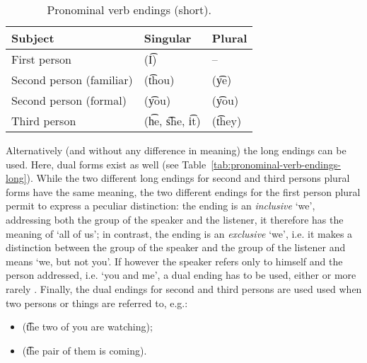 \begin{table}
\centering
\caption{Pronominal verb endings (short).}
\label{tab:pronominal-verb-endings-short}
\begin{tabular}{lll}
\toprule
Subject & Singular & Plural \\
\midrule
First person & \q{} (\t{I}) & -- \\
Second person (familiar) & \q{} (\t{thou}) & \q{} (\t{ye}) \\
Second person (formal) & \q{} (\t{you}) & \q{} (\t{you}) \\
Third person & \q{} (\t{he}, \t{she}, \t{it}) & \q{} (\t{they}) \\
\bottomrule
\end{tabular}
\end{table}

Alternatively (and without any difference in meaning) the long endings can be
used. Here, dual forms exist as well (see
Table~\ref{tab:pronominal-verb-endings-long}).
While the two different long endings for second and third persons plural forms
have the same meaning, the two different endings for the first person plural
permit to express a peculiar distinction: the ending  is an
\emph{inclusive} `we', addressing both the group of the speaker and the
listener, it therefore has the meaning of `all of us'; in contrast, the ending
 is an \emph{exclusive} `we', i.e. it makes a distinction between the
group of the speaker and the group of the listener and means `we, but not you'.
If however the speaker refers only to himself and the person addressed, i.e.
`you and me', a dual ending has to be used, either  or more rarely
. Finally, the dual endings for second and third persons are used used
when two persons or things are referred to, e.g.:
\begin{itemize}
  \item {} (\t{the two of you are watching});
  \item {} (\t{the pair of them is coming}).
\end{itemize}

